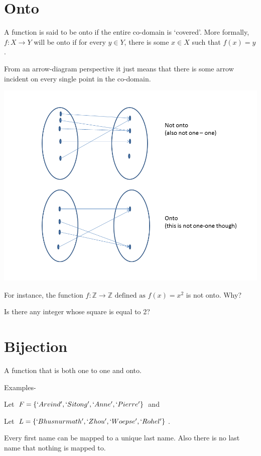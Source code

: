 \documentclass[12pt]{article}
\begin{document}
\section*{Onto}
A function is said to be onto if the entire co-domain is `covered'. More formally, $f:X \rightarrow Y$ will be onto if for every $y \in Y$, there is some $x \in X$ such that $f(x) = y$. 

From an arrow-diagram perspective it just means that there is some arrow incident on every single point in the co-domain.

\includegraphics[scale=0.7]{Onto.png}

\vspace{0.5in}

For instance, the function $f: \mathbb{Z} \rightarrow \mathbb{Z} \text{ defined as } f(x) = x^2$ is not onto.
Why?

Is there any integer whose square is equal to 2? 


\section*{Bijection}

A function that is both one to one and onto. 

Examples- 

Let $F = \{`Arvind', `Sitong', `Anne', `Pierre'\}$ and 

Let $L = \{`Bhusnurmath', `Zhou', `Woepse', `Rohel'\}$.

Every first name can be mapped to a unique last name. Also there is no last name that nothing is mapped to.
\end{document}
